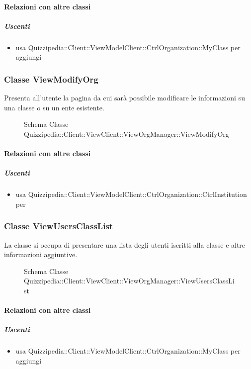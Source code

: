 \paragraph{Relazioni con altre classi}
\subparagraph{Uscenti}
\begin{itemize}
\item usa Quizzipedia::Client::ViewModelClient::CtrlOrganization::MyClass per aggiungi
\end{itemize}
\subsubsection{Classe ViewModifyOrg}
Presenta all'utente la pagina da cui sarà possibile modificare le informazioni su una classe o su un ente esistente.
\begin{figure}[H]
\centering
\noindent{}
\caption[Schema Classe ViewModifyOrg]{Schema Classe Quizzipedia::Client::ViewClient::ViewOrgManager::ViewModifyOrg}
\end{figure}
\paragraph{Relazioni con altre classi}
\subparagraph{Uscenti}
\begin{itemize}
\item usa Quizzipedia::Client::ViewModelClient::CtrlOrganization::CtrlInstitution per 
\end{itemize}
\subsubsection{Classe ViewUsersClassList}
La classe si occupa di presentare una lista degli utenti iscritti alla classe e altre informazioni aggiuntive.
\begin{figure}[H]
\centering
\noindent{}
\caption[Schema Classe ViewUsersClassList]{Schema Classe Quizzipedia::Client::ViewClient::ViewOrgManager::ViewUsersClassList}
\end{figure}
\paragraph{Relazioni con altre classi}
\subparagraph{Uscenti}
\begin{itemize}
\item usa Quizzipedia::Client::ViewModelClient::CtrlOrganization::MyClass per aggiungi
\end{itemize}
